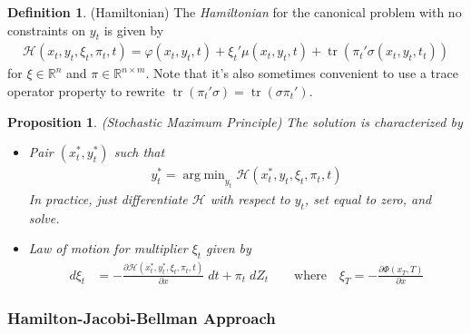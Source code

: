 \documentclass[12pt]{book}
\numberwithin{equation}{section} %
\theoremstyle{plain}
\newtheorem{prop}[thm]{Proposition}
\theoremstyle{definition}
\newtheorem{defn}[thm]{Definition}
\theoremstyle{remark}
\newcommand{\trace}{\operatorname{tr}}
\newcommand{\calH}{\mathcal{H}}
\newcommand{\R}{\mathbb{R}}
\DeclareMathOperator*{\argmin}{arg\;min}
\begin{document}
\begin{defn}(Hamiltonian)
The \emph{Hamiltonian} for the canonical problem with no constraints on
$y_t$ is given by
\begin{align*}
  \calH(x_t,y_t,\xi_t,\pi_t,t)
  =
  \varphi(x_t,y_t,t)
  +
  \xi_t'
  \mu(x_t,y_t,t)
  +
  \trace\left(
  \pi_t'
  \sigma(x_t,y_t,t_t)
  \right)
\end{align*}
for $\xi\in \R^n$ and $\pi\in\R^{n\times m}$.
Note that it's also sometimes convenient to use a trace operator
property to rewrite $\trace(\pi_t' \sigma) =\trace(\sigma\pi_t')$.
\end{defn}

\begin{prop}\emph{(Stochastic Maximum Principle)}
The solution is characterized by
\begin{itemize}
  \item
    Pair $(x_t^*,y_t^*)$ such that
    \begin{align*}
      y_t^*
      =
      \argmin_{y_t}
      \calH(x_t^*,y_t,\xi_t,\pi_t,t)
    \end{align*}
    In practice, just differentiate $\calH$ with respect to $y_t$,
    set equal to zero, and solve.

  \item Law of motion for multiplier $\xi_t$ given by
    \begin{align*}
      d\xi_t
      &=
      -\frac{\partial \calH(x_t^*,y_t^*,\xi_t,\pi_t,t)}{\partial x}
      \;dt
      +
      \pi_t
      \;dZ_t
      \qquad\text{where}\quad
      \xi_T
      =
      -\frac{\partial \Phi(x_T,T)}{\partial x}
    \end{align*}
\end{itemize}
\end{prop}


\clearpage
\subsubsection{Hamilton-Jacobi-Bellman Approach}
\end{document}
